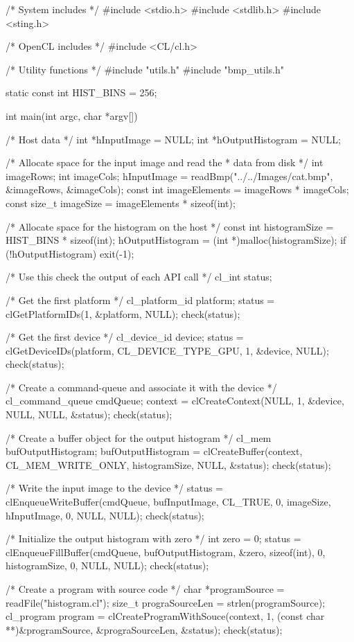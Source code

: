 \begin{codebox}[cpp]
/* System includes */
#include <stdio.h>
#include <stdlib.h>
#include <sting.h>

/* OpenCL includes */
#include <CL/cl.h>

/* Utility functions */
#include "utils.h"
#include "bmp_utils.h"

static const int HIST_BINS = 256;

int main(int argc, char *argv[]){

  /* Host data */
  int *hInputImage = NULL;
  int *hOutputHistogram = NULL;

  /* Allocate space for the input image and read the
   * data from disk */
  int imageRows;
  int imageCols;
  hInputImage = readBmp("../../Images/cat.bmp", &imageRows, &imageCols);
  const int imageElements = imageRows * imageCols;
  const size_t imageSize = imageElements * sizeof(int);

  /* Allocate space for the histogram on the host */
  const int histogramSize = HIST_BINS * sizeof(int);
  hOutputHistogram = (int *)malloc(histogramSize);
  if (!hOutputHistogram){ exit(-1); }

  /* Use this check the output of each API call */
  cl_int status;

  /* Get the first platform */
  cl_platform_id platform;
  status = clGetPlatformIDs(1, &platform, NULL);
  check(status);

  /* Get the first device */
  cl_device_id device;
  status = clGetDeviceIDs(platform, CL_DEVICE_TYPE_GPU, 1, &device, NULL);
  check(status);

  /* Create a command-queue and associate it with the device */
  cl_command_queue cmdQueue;
  context = clCreateContext(NULL, 1, &device, NULL, NULL, &status);
  check(status);

  /* Create a buffer object for the output histogram */
  cl_mem bufOutputHistogram;
  bufOutputHistogram = clCreateBuffer(context, CL_MEM_WRITE_ONLY, histogramSize, NULL, &status);
  check(status);

  /* Write the input image to the device */
  status = clEnqueueWriteBuffer(cmdQueue, bufInputImage, CL_TRUE, 0, imageSize, hInputImage, 0, NULL, NULL);
  check(status);

  /* Initialize the output histogram with zero */
  int zero = 0;
  status = clEnqueueFillBuffer(cmdQueue, bufOutputHistogram, &zero, sizeof(int), 0, histogramSize, 0, NULL, NULL);
  check(status);

  /* Create a program with source code */
  char *programSource = readFile("histogram.cl");
  size_t prograSourceLen = strlen(programSource);
  cl_program program = clCreateProgramWithSouce(context, 1, (const char **)&programSource, &prograSourceLen, &status);
  check(status);

}
\end{codebox}
